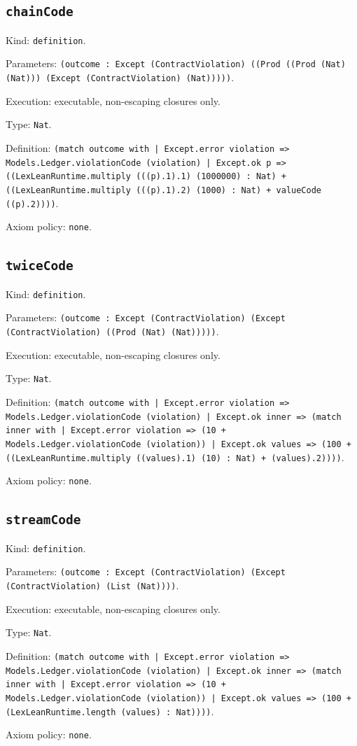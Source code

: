 \documentclass[11pt]{article}
\begin{document}
\subsection*{\texttt{chainCode}}
\noindent Kind: \texttt{definition}.\par
\noindent Parameters: \texttt{(outcome : Except (ContractViolation) ((Prod ((Prod (Nat) (Nat))) (Except (ContractViolation) (Nat)))))}.\par
\noindent Execution: executable, non-escaping closures only.\par
\noindent Type: \texttt{Nat}.\par
\noindent Definition: \texttt{(match outcome with | Except.error violation => Models.Ledger.violationCode (violation) | Except.ok p => ((LexLeanRuntime.multiply (((p).1).1) (1000000) : Nat) + ((LexLeanRuntime.multiply (((p).1).2) (1000) : Nat) + valueCode ((p).2))))}.\par
\noindent Axiom policy: \texttt{none}.\par
\subsection*{\texttt{twiceCode}}
\noindent Kind: \texttt{definition}.\par
\noindent Parameters: \texttt{(outcome : Except (ContractViolation) (Except (ContractViolation) ((Prod (Nat) (Nat)))))}.\par
\noindent Execution: executable, non-escaping closures only.\par
\noindent Type: \texttt{Nat}.\par
\noindent Definition: \texttt{(match outcome with | Except.error violation => Models.Ledger.violationCode (violation) | Except.ok inner => (match inner with | Except.error violation => (10 + Models.Ledger.violationCode (violation)) | Except.ok values => (100 + ((LexLeanRuntime.multiply ((values).1) (10) : Nat) + (values).2))))}.\par
\noindent Axiom policy: \texttt{none}.\par
\subsection*{\texttt{streamCode}}
\noindent Kind: \texttt{definition}.\par
\noindent Parameters: \texttt{(outcome : Except (ContractViolation) (Except (ContractViolation) (List (Nat))))}.\par
\noindent Execution: executable, non-escaping closures only.\par
\noindent Type: \texttt{Nat}.\par
\noindent Definition: \texttt{(match outcome with | Except.error violation => Models.Ledger.violationCode (violation) | Except.ok inner => (match inner with | Except.error violation => (10 + Models.Ledger.violationCode (violation)) | Except.ok values => (100 + (LexLeanRuntime.length (values) : Nat))))}.\par
\noindent Axiom policy: \texttt{none}.\par
\end{document}
